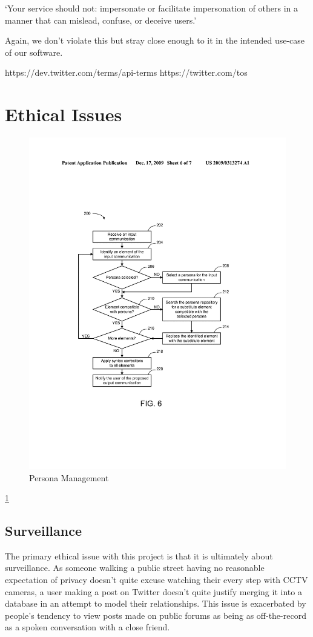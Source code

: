 `Your service should not: impersonate or facilitate impersonation of others in a manner that can mislead, confuse, or deceive users.'

Again, we don't violate this but stray close enough to it in the intended use-case of our software.

https://dev.twitter.com/terms/api-terms
https://twitter.com/tos

\section{Ethical Issues}

\begin{figure}[htbp]
	\centering
	\includegraphics[width=0.7\linewidth]{img/persona_management_flow.png}
	\caption{Persona Management}
	\label{fig:persona_management_workflow}
\end{figure}

\ref{fig:persona_management_workflow}

\subsection{Surveillance}
The primary ethical issue with this project is that it is ultimately about surveillance. As someone walking a public street having no reasonable expectation of privacy doesn't quite excuse watching their every step with CCTV cameras, a user making a post on Twitter doesn't quite justify merging it into a database in an attempt to model their relationships. This issue is exacerbated by people's tendency to view posts made on public forums as being as off-the-record as a spoken conversation with a close friend.

